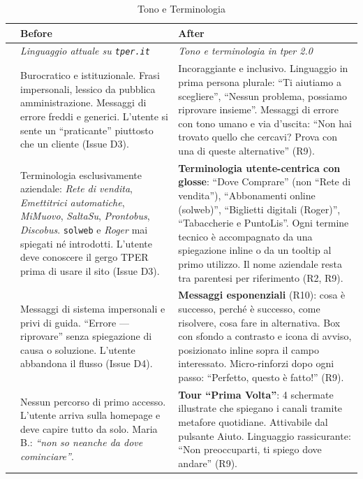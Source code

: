 \begin{table}[H]
\centering
\small
\renewcommand{\arraystretch}{1.4}
\begin{tabular}{|p{0.5cm}|p{7cm}|p{7cm}|}
\hline
& \textbf{Before} & \textbf{After} \\ \hline
\cellcolor{primaryColor!15} &
\textit{Linguaggio attuale su \texttt{tper.it}} &
\textit{Tono e terminologia in tper 2.0} \\ \hline

\raisebox{0.5cm}{\rotatebox{90}{\textbf{Tono}}} &
Burocratico e istituzionale. Frasi impersonali, lessico da pubblica amministrazione. Messaggi di errore freddi e generici. L'utente si sente un ``praticante'' piuttosto che un cliente (Issue D3). &
Incoraggiante e inclusivo. Linguaggio in prima persona plurale: ``Ti aiutiamo a scegliere'', ``Nessun problema, possiamo riprovare insieme''. Messaggi di errore con tono umano e via d'uscita: ``Non hai trovato quello che cercavi? Prova con una di queste alternative'' (R9). \\ \hline

\raisebox{0.5cm}{\rotatebox{90}{\textbf{Termini}}} &
Terminologia esclusivamente aziendale: \textit{Rete di vendita}, \textit{Emettitrici automatiche}, \textit{MiMuovo}, \textit{SaltaSu}, \textit{Prontobus}, \textit{Discobus}. \texttt{solweb} e \textit{Roger} mai spiegati né introdotti. L'utente deve conoscere il gergo TPER prima di usare il sito (Issue D3). &
\textbf{Terminologia utente-centrica con glosse}: ``Dove Comprare'' (non ``Rete di vendita''), ``Abbonamenti online (solweb)'', ``Biglietti digitali (Roger)'', ``Tabaccherie e PuntoLis''. Ogni termine tecnico è accompagnato da una spiegazione inline o da un tooltip al primo utilizzo. Il nome aziendale resta tra parentesi per riferimento (R2, R9). \\ \hline

\raisebox{0.5cm}{\rotatebox{90}{\textbf{Messaggi}}} &
Messaggi di sistema impersonali e privi di guida. ``Errore --- riprovare'' senza spiegazione di causa o soluzione. L'utente abbandona il flusso (Issue D4). &
\textbf{Messaggi esponenziali} (R10): cosa è successo, perché è successo, come risolvere, cosa fare in alternativa. Box con sfondo a contrasto e icona di avviso, posizionato inline sopra il campo interessato. Micro-rinforzi dopo ogni passo: ``Perfetto, questo è fatto!'' (R9). \\ \hline

\raisebox{0.5cm}{\rotatebox{90}{\textbf{Onboarding}}} &
Nessun percorso di primo accesso. L'utente arriva sulla homepage e deve capire tutto da solo. Maria B.: \textit{``non so neanche da dove cominciare''}. &
\textbf{Tour ``Prima Volta''}: 4 schermate illustrate che spiegano i canali tramite metafore quotidiane. Attivabile dal pulsante Aiuto. Linguaggio rassicurante: ``Non preoccuparti, ti spiego dove andare'' (R9). \\ \hline
\end{tabular}
\caption{Tono e Terminologia}
\label{tab:comparison-tone}
\end{table}



